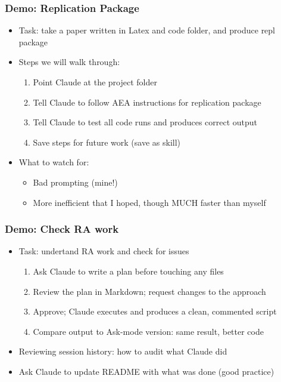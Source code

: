\documentclass[aspectratio=169, 12pt]{beamer}
\begin{document}
\begin{frame}
\frametitle{Demo: Replication Package}

\begin{itemize}
    \item Task: take a paper written in Latex and code folder, and produce repl package
    \item Steps we will walk through:
        \begin{enumerate}
            \item Point Claude at the project folder
            \item Tell Claude to follow AEA instructions for replication package
            \item Tell Claude to test all code runs and produces correct output
            \item Save steps for future work (save as skill)
        \end{enumerate}
    \item What to watch for:
        \begin{itemize}
            \item[$\circ$] Bad prompting (mine!)
             \item[$\circ$] More inefficient that I hoped, though MUCH faster than myself
        \end{itemize}
\end{itemize}

\end{frame}


\begin{frame}
\frametitle{Demo: Check RA work}

\begin{itemize}
    \item Task: undertand RA work and check for issues
        \begin{enumerate}
            \item Ask Claude to write a plan before touching any files
            \item Review the plan in Markdown; request changes to the approach
            \item Approve; Claude executes and produces a clean, commented script
            \item Compare output to Ask-mode version: same result, better code
        \end{enumerate}
    \item Reviewing session history: how to audit what Claude did
    \item Ask Claude to update README with what was done (good practice)
\end{itemize}

\end{frame}
\end{document}

